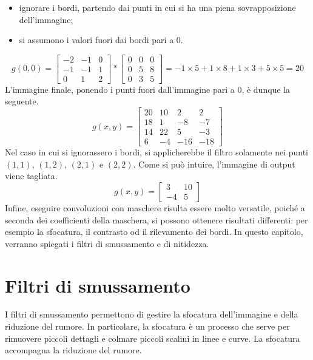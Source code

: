 \begin{itemize}
    \item ignorare i bordi, partendo dai punti in cui si ha una piena sovrapposizione dell'immagine;
    \item si assumono i valori fuori dai bordi pari a 0.
\end{itemize}
\begin{equation*}
    g(0,0)=\begin{bmatrix}
            -2 & -1 & 0 \\
            -1 & -1 & 1 \\
            0 & 1 & 2
         \end{bmatrix}*\begin{bmatrix}
            0 & 0 & 0 \\
            0 & 5 & 8 \\
            0 & 3 & 5
        \end{bmatrix}=-1\times 5 + 1 \times 8 + 1 \times 3 + 5 \times 5 = 20
\end{equation*}
L'immagine finale, ponendo i punti fuori dall'immagine pari a $0$, è dunque la seguente.
\begin{equation*}
    g(x,y)=\begin{bmatrix}
            20 & 10 & 2 & 2 \\
            18 & 1 & -8 & -7 \\
            14 & 22 & 5 & -3 \\
            6 & -4 & -16 & -18
         \end{bmatrix}
\end{equation*}
Nel caso in cui si ignorassero i bordi, si applicherebbe il filtro solamente nei punti $(1,1)$, $(1,2)$, $(2,1)$ e $(2,2)$. Come si può intuire, l'immagine di output viene tagliata.
\begin{equation*}
    g(x,y)=\begin{bmatrix}
            3 & 10\\
            -4 & 5  
         \end{bmatrix}
\end{equation*}
Infine, eseguire convoluzioni con maschere risulta essere molto versatile, poiché a seconda dei coefficienti della maschera, si possono ottenere risultati differenti: per esempio la sfocatura, il contrasto od il rilevamento dei bordi. In questo capitolo, verranno spiegati i filtri di smussamento e di nitidezza.
\section{Filtri di smussamento}
I filtri di smussamento permettono di gestire la sfocatura dell'immagine e della riduzione del rumore. In particolare, la sfocatura è un processo che serve per rimuovere piccoli dettagli e colmare piccoli scalini in linee e curve. La sfocatura accompagna la riduzione del rumore. 

